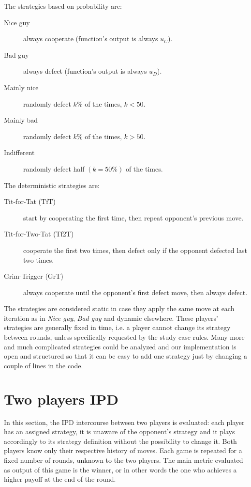 \documentclass[journal,10pt,twoside]{IEEEtran}
\begin{document}
The strategies based on probability are:
\begin{description}
    \item[Nice guy] always cooperate (function's output is always $u_C$).
    \item[Bad guy] always defect (function's output is always $u_D$).
    \item[Mainly nice] randomly defect $k\%$ of the times, $k<50$.%
    \item[Mainly bad] randomly defect $k\%$ of the times, $k>50$.%
    \item[Indifferent] randomly defect half $(k=50\%)$ of the times.
\end{description}

The deterministic strategies are:
\begin{description}
    \item[Tit-for-Tat (TfT)] start by cooperating the first time, then repeat opponent's previous move.
    \item[Tit-for-Two-Tat (Tf2T)] cooperate the first two times, then defect only if the opponent defected last two times.
    \item[Grim-Trigger (GrT)] always cooperate until the opponent's first defect move, then always defect. 
\end{description}

The strategies are considered static in case they apply the same move at each iteration as in \textit{Nice guy}, \textit{Bad guy} and dynamic elsewhere.
These players' strategies are generally fixed in time, i.e. a player cannot change its strategy between rounds, unless specifically requested by the study case rules.%
Many more and much complicated strategies could be analyzed and our implementation is open and structured so that it can be easy to add one strategy just by changing a couple of lines in the code.

\section{Two players IPD} \label{s:IPD2P}
In this section, the IPD intercourse between two players is evaluated: each player has an assigned strategy, it is unaware of the opponent's strategy and it plays accordingly to its strategy definition without the possibility to change it. Both players know only their respective history of moves. Each game is repeated for a fixed number of rounds, unknown to the two players. The main metric evaluated as output of this game is the winner, or in other words the one who achieves a higher payoff at the end of the round.
\end{document}
